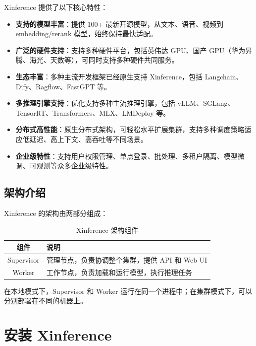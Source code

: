\documentclass[12pt,UTF8]{ctexbook}
\begin{document}
Xinference 提供了以下核心特性：

\begin{itemize}[leftmargin=2cm]
    \item \textbf{支持的模型丰富}：提供 100+ 最新开源模型，从文本、语音、视频到 embedding/rerank 模型，始终保持最快适配。

    \item \textbf{广泛的硬件支持}：支持多种硬件平台，包括英伟达 GPU、国产 GPU（华为昇腾、海光、天数等），可同时支持多种硬件共同服务。

    \item \textbf{生态丰富}：多种主流开发框架已经原生支持 Xinference，包括 Langchain、Dify、Ragflow、FastGPT 等。

    \item \textbf{多推理引擎支持}：优化支持多种主流推理引擎，包括 vLLM、SGLang、TensorRT、Transformers、MLX、LMDeploy 等。

    \item \textbf{分布式高性能}：原生分布式架构，可轻松水平扩展集群，支持多种调度策略适应低延迟、高上下文、高吞吐等不同场景。

    \item \textbf{企业级特性}：支持用户权限管理、单点登录、批处理、多租户隔离、模型微调、可观测等众多企业级特性。
\end{itemize}

\section{架构介绍}
\label{sec:architecture}

Xinference 的架构由两部分组成：

\begin{table}[htbp]
    \centering
    \caption{Xinference 架构组件}
    \begin{tabular}{|c|p{8cm}|}
        \hline
        \textbf{组件} & \textbf{说明} \\
        \hline
        Supervisor & 管理节点，负责协调整个集群，提供 API 和 Web UI \\
        \hline
        Worker & 工作节点，负责加载和运行模型，执行推理任务 \\
        \hline
    \end{tabular}
\end{table}

在本地模式下，Supervisor 和 Worker 运行在同一个进程中；在集群模式下，可以分别部署在不同的机器上。

\chapter{安装 Xinference}
\label{chap:installation}
\end{document}
